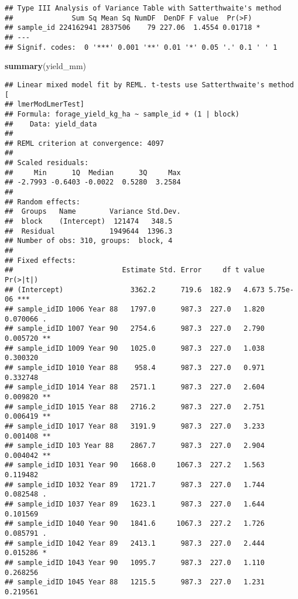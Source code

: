 \documentclass[
]{article}
\newenvironment{Shaded}{\begin{snugshade}}{\end{snugshade}}
\newcommand{\FunctionTok}[1]{\textcolor[rgb]{0.13,0.29,0.53}{\textbf{#1}}}
\newcommand{\NormalTok}[1]{#1}
\begin{document}
\begin{verbatim}
## Type III Analysis of Variance Table with Satterthwaite's method
##              Sum Sq Mean Sq NumDF  DenDF F value  Pr(>F)  
## sample_id 224162941 2837506    79 227.06  1.4554 0.01718 *
## ---
## Signif. codes:  0 '***' 0.001 '**' 0.01 '*' 0.05 '.' 0.1 ' ' 1
\end{verbatim}

\begin{Shaded}
\begin{Highlighting}[]
\FunctionTok{summary}\NormalTok{(yield\_mm)}
\end{Highlighting}
\end{Shaded}

\begin{verbatim}
## Linear mixed model fit by REML. t-tests use Satterthwaite's method [
## lmerModLmerTest]
## Formula: forage_yield_kg_ha ~ sample_id + (1 | block)
##    Data: yield_data
## 
## REML criterion at convergence: 4097
## 
## Scaled residuals: 
##     Min      1Q  Median      3Q     Max 
## -2.7993 -0.6403 -0.0022  0.5280  3.2584 
## 
## Random effects:
##  Groups   Name        Variance Std.Dev.
##  block    (Intercept)  121474   348.5  
##  Residual             1949644  1396.3  
## Number of obs: 310, groups:  block, 4
## 
## Fixed effects:
##                          Estimate Std. Error     df t value Pr(>|t|)    
## (Intercept)                3362.2      719.6  182.9   4.673 5.75e-06 ***
## sample_idID 1006 Year 88   1797.0      987.3  227.0   1.820 0.070066 .  
## sample_idID 1007 Year 90   2754.6      987.3  227.0   2.790 0.005720 ** 
## sample_idID 1009 Year 90   1025.0      987.3  227.0   1.038 0.300320    
## sample_idID 1010 Year 88    958.4      987.3  227.0   0.971 0.332748    
## sample_idID 1014 Year 88   2571.1      987.3  227.0   2.604 0.009820 ** 
## sample_idID 1015 Year 88   2716.2      987.3  227.0   2.751 0.006419 ** 
## sample_idID 1017 Year 88   3191.9      987.3  227.0   3.233 0.001408 ** 
## sample_idID 103 Year 88    2867.7      987.3  227.0   2.904 0.004042 ** 
## sample_idID 1031 Year 90   1668.0     1067.3  227.2   1.563 0.119482    
## sample_idID 1032 Year 89   1721.7      987.3  227.0   1.744 0.082548 .  
## sample_idID 1037 Year 89   1623.1      987.3  227.0   1.644 0.101569    
## sample_idID 1040 Year 90   1841.6     1067.3  227.2   1.726 0.085791 .  
## sample_idID 1042 Year 89   2413.1      987.3  227.0   2.444 0.015286 *  
## sample_idID 1043 Year 90   1095.7      987.3  227.0   1.110 0.268256    
## sample_idID 1045 Year 88   1215.5      987.3  227.0   1.231 0.219561    

\end{verbatim}
\end{document}

